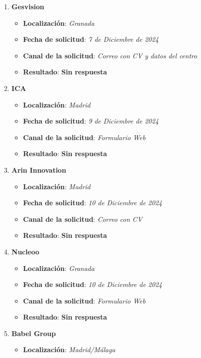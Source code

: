 \begin{enumerate}
\begin{itemize}
	\end{itemize}
 	\item \textbf{Gesvision}
	\begin{itemize}
		\item \textbf{Localización}: \textit{Granada}
		\item \textbf{Fecha de solicitud}: \textit{7 de Diciembre de 2024}
		\item \textbf{Canal de la solicitud}: \textit{Correo con CV y datos del centro}
		\item \textbf{Resultado}: {\color{orange} \textbf{Sin respuesta}}
	\end{itemize}
	\item \textbf{ICA}
	\begin{itemize}
		\item \textbf{Localización}: \textit{Madrid}
		\item \textbf{Fecha de solicitud}: \textit{9 de Diciembre de 2024}
		\item \textbf{Canal de la solicitud}: \textit{Formulario Web}
		\item \textbf{Resultado}: {\color{orange} \textbf{Sin respuesta}}
	\end{itemize}
	\item \textbf{Arin Innovation}
	\begin{itemize}
		\item \textbf{Localización}: \textit{Madrid}
		\item \textbf{Fecha de solicitud}: \textit{10 de Diciembre de 2024}
		\item \textbf{Canal de la solicitud}: \textit{Correo con CV}
		\item \textbf{Resultado}: {\color{orange} \textbf{Sin respuesta}}
	\end{itemize}
	\item \textbf{Nucleoo}
	\begin{itemize}
		\item \textbf{Localización}: \textit{Granada}
		\item \textbf{Fecha de solicitud}: \textit{10 de Diciembre de 2024}
		\item \textbf{Canal de la solicitud}: \textit{Formulario Web}
		\item \textbf{Resultado}: {\color{orange} \textbf{Sin respuesta}}
	\end{itemize}
	 \item \textbf{Babel Group}
	\begin{itemize}
		\item \textbf{Localización}: \textit{Madrid/Málaga}

\end{itemize}
\end{enumerate}
